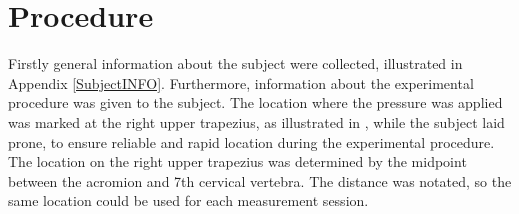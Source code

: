 



\section{Procedure}
Firstly general information about the subject were collected, illustrated in Appendix \ref{SubjectINFO}. Furthermore, information about the experimental procedure was given to the subject. The location where the pressure was applied  was marked at the right upper trapezius, as illustrated in , while the subject laid prone, to ensure reliable and rapid location during the experimental procedure. The location on the right upper trapezius was determined by the midpoint between the acromion and 7th cervical vertebra. The distance was notated, so the same location could be used for each measurement session. 


